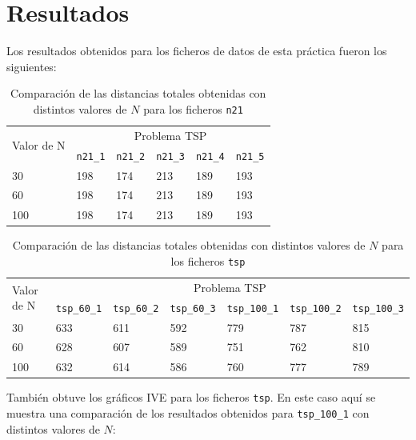 \documentclass[a4paper,11pt]{article}
\begin{document}
\newpage
\section{Resultados}
Los resultados obtenidos para los ficheros de datos de esta práctica fueron los siguientes:

\begin{table}[!htbp]
\label{results_n21}
\centering
\begin{tabularx}{\textwidth}{|p{2cm}|X|X|X|X|X|}
\hline
\multirow{2}{*}{Valor de N}  &   \multicolumn{5}{|c|}{Problema TSP}  \\ \cline{2-6}
	& \texttt{n21\_1}	& \texttt{n21\_2}	& \texttt{n21\_3}	& \texttt{n21\_4}	& \texttt{n21\_5} \\ \hline
30	& 198   & 174   & 213   & 189   & 193   \\ \hline
60	& 198   & 174   & 213   & 189   & 193   \\ \hline
100	& 198   & 174   & 213   & 189   & 193   \\ \hline
\end{tabularx}
\caption{Comparación de las distancias totales obtenidas con distintos valores de ${N}$ para los ficheros \texttt{n21}}
\end{table}

\begin{table}[!htbp]
\label{results_tsp}
\centering
\begin{tabularx}{\textwidth}{|p{2cm}|X|X|X|X|X|X|}
\hline
\multirow{2}{*}{Valor de N}  &   \multicolumn{6}{|c|}{Problema TSP}  \\ \cline{2-7}
	& \texttt{tsp\_60\_1}	& \texttt{tsp\_60\_2}	& \texttt{tsp\_60\_3}	& \texttt{tsp\_100\_1}	& \texttt{tsp\_100\_2}	& \texttt{tsp\_100\_3} \\ \hline
30	&    633	& 611   & 592   & 779   & 787    & 815  \\ \hline
60	&    628	& 607   & 589   & 751   & 762    & 810  \\ \hline
100	&    632	& 614   & 586   & 760   & 777    & 789  \\ \hline
\end{tabularx}
\caption{Comparación de las distancias totales obtenidas con distintos valores de ${N}$ para los ficheros \texttt{tsp}}
\end{table}

También obtuve los gráficos IVE para los ficheros \texttt{tsp}. En este caso aquí se muestra una comparación de los resultados obtenidos para \texttt{tsp\_100\_1} con distintos valores de $N$:
\end{document}
